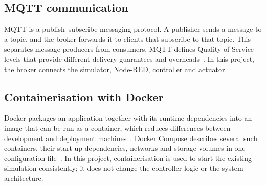 \documentclass[12pt,a4paper,oneside]{report}
\begin{document}
\subsection{MQTT communication}
MQTT is a publish--subscribe messaging protocol. A publisher sends a message to a topic, and the broker forwards it to clients that subscribe to that topic. This separates message producers from consumers. MQTT defines Quality of Service levels that provide different delivery guarantees and overheads~\cite{ref1}. In this project, the broker connects the simulator, Node-RED, controller and actuator.

\subsection{Containerisation with Docker}
Docker packages an application together with its runtime dependencies into an image that can be run as a container, which reduces differences between development and deployment machines~\cite{ref7}. Docker Compose describes several such containers, their start-up dependencies, networks and storage volumes in one configuration file~\cite{ref8}. In this project, containerisation is used to start the existing simulation consistently; it does not change the controller logic or the system architecture.
\end{document}
